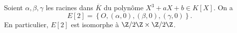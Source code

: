 
\begin{lemme}
    Soient $\alpha,\beta,\gamma$ les racines dans $\overline{K}$ du polynôme $X^3+aX+b \in K[X]$. On a
    \[
    E[2]=\left\{ O,\left( \alpha,0 \right) , \left( \beta,0 \right) ,\left( \gamma,0 \right)  \right\} 
    .\] 
    En particulier, $E[2]$ est isomorphe à $\Z /2\Z \times \Z /2\Z$.
\end{lemme}

\begin{demonstration}
    
\end{demonstration}
